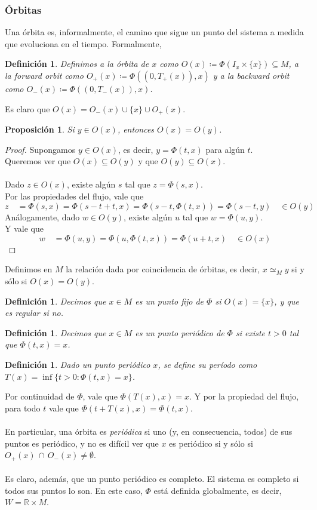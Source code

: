 \documentclass[12pt,a4paper]{article}
\newtheorem{proposition}[theorem]{Proposición}
\newtheorem{definition}[theorem]{Definición}
\begin{document}
\subsubsection{Órbitas}
Una órbita es, informalmente, el camino que sigue un punto del sistema a medida que evoluciona en el tiempo. Formalmente,
\begin{definition}
    Definimos a la órbita de $x$ como $O(x) \coloneqq \Phi(I_x \times \{x\}) \subseteq M$, a la forward orbit como $O_+(x) \coloneqq \Phi((0,T_+(x)),x)$ y a la backward orbit como $O_-(x) \coloneqq \Phi((0,T_-(x)),x)$.
\end{definition}
Es claro que $O(x) = O_-(x) \cup \{x\} \cup O_+(x)$.
\begin{proposition}    
Si $y \in O(x)$, entonces $O(x) = O(y)$.
\end{proposition}
\begin{proof}
    Supongamos $y \in O(x)$, es decir, $y = \Phi(t,x)$ para algún $t$.
    \\
    Queremos ver que $O(x) \subseteq O(y)$ y que $O(y) \subseteq O(x)$.
    \\
    \\
    Dado $z \in O(x)$, existe algún $s$ tal que $z = \Phi(s,x)$.
    \\
    Por las propiedades del flujo, vale que
    \[
    z \quad = \Phi(s,x) = \Phi(s-t+t, x) = \Phi(s-t, \Phi(t,x)) = \Phi(s-t, y) \quad \in O(y)
    \]
    Análogamente, dado $w \in O(y)$, existe algún $u$ tal que $w = \Phi(u,y)$.
    \\
    Y vale que
    \[
    w \quad = \Phi(u,y) = \Phi(u, \Phi(t,x)) = \Phi(u+t,x) \quad \in O(x)
    \]
\end{proof}
Definimos en $M$ la relación dada por coincidencia de órbitas, es decir, $x \simeq_M y$ si y sólo si $O(x) = O(y)$.
\begin{definition}
    Decimos que $x \in M$ es un punto fijo de $\Phi$ si $O(x) = \{x\}$, y que es regular si no.
\end{definition}
\begin{definition}
    Decimos que $x \in M$ es un punto periódico de $\Phi$ si existe $t > 0$ tal que $\Phi(t,x) = x$.
\end{definition}
\begin{definition}
    Dado un punto periódico $x$, se define su período como $T(x) = \inf \{t > 0 : \Phi(t,x) = x\}$.
\end{definition}
Por continuidad de $\Phi$, vale que $\Phi(T(x),x) = x$. Y por la propiedad del flujo, para todo $t$ vale que $\Phi(t + T(x), x) = \Phi(t,x)$.
\\
\\
En particular, una órbita es \textit{periódica} si uno (y, en consecuencia, todos) de sus puntos es periódico, y no es difícil ver que $x$ es periódico si y sólo si $O_+(x) \, \cap \, O_-(x) \neq \emptyset$.
\\
\\
Es claro, además, que un punto periódico es completo. El sistema es completo si todos sus puntos lo son. En este caso, $\Phi$ está definida globalmente, es decir, $W = \mathbb{R} \times M$.
\\
\\
\end{document}
